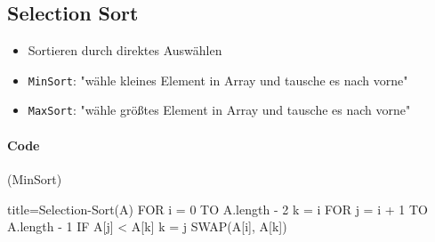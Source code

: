 \documentclass[
    ngerman,
    color=3b,
    dark_mode,
    load_common, %
    summary,
    boxarc,
]{rubos-tuda-template}
\begin{document}
\subsection{Selection Sort}\label{Selection sort}
\begin{idea}
    \begin{itemize}
        \item Sortieren durch direktes Auswählen
        \item \texttt{MinSort}: "wähle kleines Element in Array und tausche es nach vorne"
        \item \texttt{MaxSort}: "wähle grö\ss{}tes Element in Array und tausche es nach vorne"
    \end{itemize}
\end{idea}

\paragraph{Code} (MinSort)
\begin{codeBlock}[autogobble]{title=Selection-Sort(A)}
    FOR i = 0 TO A.length - 2
        k = i
        FOR j = i + 1 TO A.length - 1
            IF A[j] < A[k]
                k = j
        SWAP(A[i], A[k])
\end{codeBlock}

\clearpage
\end{document}
